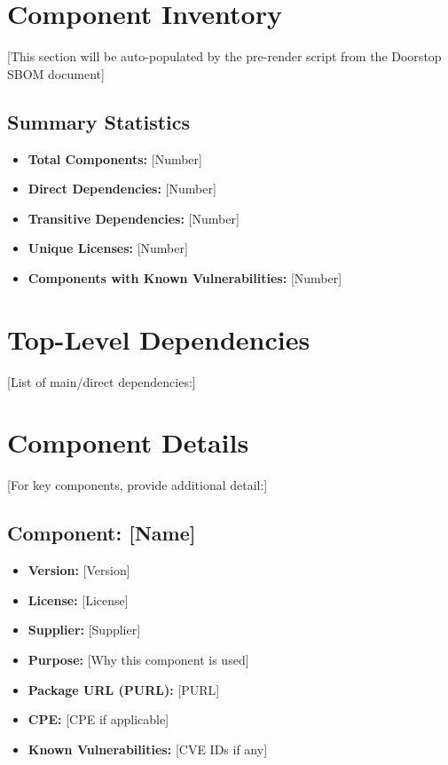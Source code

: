 \documentclass[
  11 pt,
  a4paper,
  table]{report}
\providecommand{\tightlist}{%
  \setlength{\itemsep}{0pt}\setlength{\parskip}{0pt}}\usepackage{longtable,booktabs,array}
\begin{document}
\section{Component Inventory}\label{component-inventory}

{[}This section will be auto-populated by the pre-render script from the
Doorstop SBOM document{]}

\subsection{Summary Statistics}\label{summary-statistics}

\begin{itemize}
\tightlist
\item
  \textbf{Total Components:} {[}Number{]}
\item
  \textbf{Direct Dependencies:} {[}Number{]}
\item
  \textbf{Transitive Dependencies:} {[}Number{]}
\item
  \textbf{Unique Licenses:} {[}Number{]}
\item
  \textbf{Components with Known Vulnerabilities:} {[}Number{]}
\end{itemize}

\section{Top-Level Dependencies}\label{top-level-dependencies}

{[}List of main/direct dependencies:{]}

\section{Component Details}\label{component-details}

{[}For key components, provide additional detail:{]}

\subsection{Component: {[}Name{]}}\label{component-name}

\begin{itemize}
\tightlist
\item
  \textbf{Version:} {[}Version{]}
\item
  \textbf{License:} {[}License{]}
\item
  \textbf{Supplier:} {[}Supplier{]}
\item
  \textbf{Purpose:} {[}Why this component is used{]}
\item
  \textbf{Package URL (PURL):} {[}PURL{]}
\item
  \textbf{CPE:} {[}CPE if applicable{]}
\item
  \textbf{Known Vulnerabilities:} {[}CVE IDs if any{]}
\end{itemize}
\end{document}
